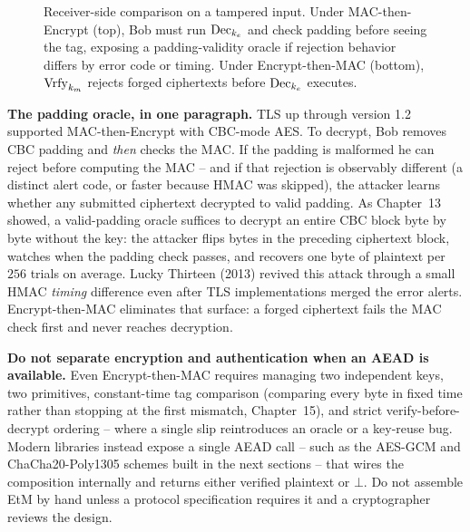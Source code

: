 \begin{figure}[htbp]
\caption{Receiver-side comparison on a tampered input. Under MAC-then-Encrypt (top), Bob must run $\operatorname{Dec}_{k_e}$ and check padding before seeing the tag, exposing a padding-validity oracle if rejection behavior differs by error code or timing. Under Encrypt-then-MAC (bottom), $\operatorname{Vrfy}_{k_m}$ rejects forged ciphertexts before $\operatorname{Dec}_{k_e}$ executes.}
\label{fig:ch16-verify-vs-decrypt}
\end{figure}

\begin{attackbox}
\textbf{The padding oracle, in one paragraph.} TLS up through version 1.2 supported MAC-then-Encrypt with CBC-mode AES. To decrypt, Bob removes CBC padding and \emph{then} checks the MAC. If the padding is malformed he can reject before computing the MAC -- and if that rejection is observably different (a distinct alert code, or faster because HMAC was skipped), the attacker learns whether any submitted ciphertext decrypted to valid padding. As Chapter~13 showed, a valid-padding oracle suffices to decrypt an entire CBC block byte by byte without the key: the attacker flips bytes in the preceding ciphertext block, watches when the padding check passes, and recovers one byte of plaintext per $256$ trials on average. Lucky Thirteen (2013) revived this attack through a small HMAC \emph{timing} difference even after TLS implementations merged the error alerts. Encrypt-then-MAC eliminates that surface: a forged ciphertext fails the MAC check first and never reaches decryption.
\end{attackbox}

\begin{trapbox}
\textbf{Do not separate encryption and authentication when an AEAD is available.} Even Encrypt-then-MAC requires managing two independent keys, two primitives, constant-time tag comparison (comparing every byte in fixed time rather than stopping at the first mismatch, Chapter~15), and strict verify-before-decrypt ordering -- where a single slip reintroduces an oracle or a key-reuse bug. Modern libraries instead expose a single AEAD call -- such as the AES-GCM and ChaCha20-Poly1305 schemes built in the next sections -- that wires the composition internally and returns either verified plaintext or $\bot$. Do not assemble EtM by hand unless a protocol specification requires it and a cryptographer reviews the design.
\end{trapbox}

